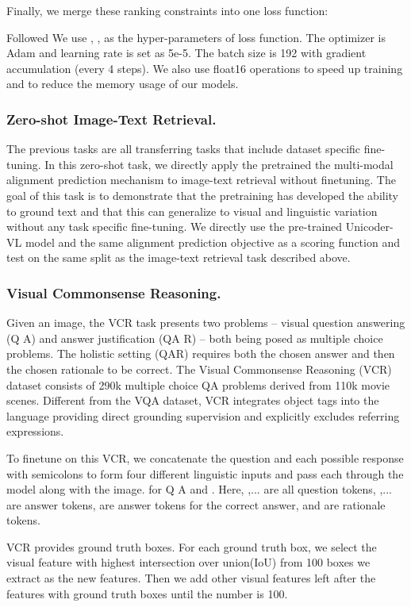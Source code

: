 \documentclass[letterpaper]{article} \usepackage{aaai20}  \usepackage{times}  \usepackage{helvet} \usepackage{courier}  \usepackage[hyphens]{url}  \usepackage{graphicx} \urlstyle{rm} \def\UrlFont{\rm}  \usepackage{graphicx}  \frenchspacing  \setlength{\pdfpagewidth}{8.5in}  \setlength{\pdfpageheight}{11in}  \usepackage{amssymb}
\begin{document}
Finally, we merge these ranking constraints into one loss function:

Followed We use , ,   as the hyper-parameters of loss function. The optimizer is Adam and learning rate is set as 5e-5. The batch size is 192 with gradient accumulation (every 4 steps). We also use float16 operations to speed up training and to reduce the memory usage of our models. 

\subsubsection{Zero-shot Image-Text Retrieval.}
The previous tasks are all transferring tasks that include dataset specific fine-tuning. In this zero-shot task, we directly apply the pretrained the multi-modal alignment prediction mechanism to image-text retrieval  without finetuning. The goal of this task is to demonstrate that the pretraining
has developed the ability to ground text and that this can generalize to visual and linguistic variation
without any task specific fine-tuning. We directly use the pre-trained Unicoder-VL model and the same alignment prediction objective as a scoring function
and test on the same split as the image-text retrieval task described above. 


\subsubsection{Visual Commonsense Reasoning.} Given an image, the VCR task presents two problems – visual question answering (Q A) and answer justification (QA R) – both being posed as multiple choice problems. The holistic setting (QAR) requires both the chosen answer and then the
chosen rationale to be correct. The Visual Commonsense Reasoning (VCR) dataset consists of 290k multiple choice QA problems derived from 110k movie scenes. Different from the VQA dataset,
VCR integrates object tags into the language providing direct grounding supervision and explicitly excludes referring expressions. 

To finetune on this VCR, we concatenate the question and each possible response with  semicolons to form four different linguistic inputs and pass each through the model along with the
image.  for Q A and  . Here, ,... are all question tokens, ,... are answer tokens,  are answer tokens for the correct answer, and  are rationale tokens. 

VCR provides ground truth boxes. For each ground truth box, we select the visual feature with highest intersection over union(IoU) from 100 boxes we extract as the new features. Then we add other visual features left after the features with ground truth boxes until the number is 100.
\end{document}
